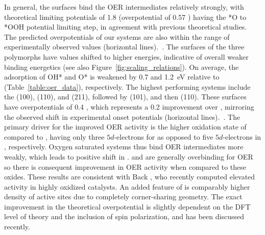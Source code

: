 %
In general, the \rIrOtwo surfaces bind the OER intermediates relatively strongly, with theoretical limiting potentials of \mytilde\num{1.8} \VRHE (overpotential of \num{0.57} \VRHE) having the *O to *OOH potential limiting step, in agreement with previous theoretical studies.~\cite{Briquet2017,Strickler2019,Raman2020}
%
The predicted overpotentials of our \rIrOtwo systems are also within the range of experimentally observed values (horizontal lines).~\cite{Seitz2016, Kuo2017}.
%
The surfaces of the three \IrOthree polymorphs have \DGOmOH{} values shifted to higher energies, indicative of overall weaker binding energetics (see also Figure~\ref{fig:scaling_relations}).
%
On average, the adsorption of OH* and O* is weakened by \num{0.7} and \SI{1.2}{\electronvolt} relative to \IrOtwo (Table~\ref{table:oer_data}), respectively.
%
The highest performing systems include the \aIrOthree (100), (110), and (211), followed by \bIrOthree (101), and then \rIrOthree (110).
%
These surfaces have overpotentials of \mytilde\num{0.4} \VRHE,
which represents a \mytilde\num{0.2} \VRHE improvement over \rIrOtwo, mirroring the observed shift in experimental onset potentials (horizontal lines).~\cite{Seitz2016, Kuo2017}.
%
The primary driver for the improved OER activity is the higher oxidation state of \IrOthree compared to \IrOtwo, having only three $5d$-electrons for  as opposed to five $5d$-electrons in , respectively.
%
Oxygen saturated \IrOthree systems thus bind OER intermediates more weakly, which leads to positive shift in \DGOmOH{}.
%
\IrOtwo and \RhOtwo are generally overbinding for OER~\cite{Dickens2019} so there is consequent improvement in OER activity when compared to these oxides.
%
These results are consistent with Back , who recently computed elevated activity in highly oxidized \IrOthree catalysts.\cite{Back2019}
%
An added feature of \aIrOthree is comparably higher density of active sites due to completely corner-sharing geometry.
%
The exact improvement in the theoretical overpotential is slightly dependent on the DFT level of theory and the inclusion of spin polarization, and has been discussed recently.~\cite{Briquet2017,Strickler2019}
